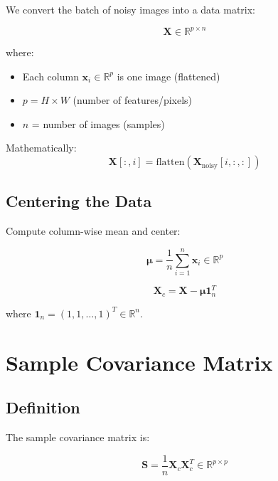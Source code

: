 \documentclass[12pt,a4paper]{article}
\begin{document}
We convert the batch of noisy images into a data matrix:

\begin{equation}
\mathbf{X} \in \mathbb{R}^{p \times n}
\end{equation}

where:
\begin{itemize}
    \item Each column $\mathbf{x}_i \in \mathbb{R}^p$ is one image (flattened)
    \item $p = H \times W$ (number of features/pixels)
    \item $n$ = number of images (samples)
\end{itemize}

Mathematically:
\begin{equation}
\mathbf{X}[:, i] = \text{flatten}(\mathbf{X}_{\text{noisy}}[i, :, :])
\end{equation}

\subsection{Centering the Data}

Compute column-wise mean and center:

\begin{equation}
\boldsymbol{\mu} = \frac{1}{n}\sum_{i=1}^n \mathbf{x}_i \in \mathbb{R}^p
\end{equation}

\begin{equation}
\mathbf{X}_c = \mathbf{X} - \boldsymbol{\mu} \mathbf{1}_n^T
\end{equation}

where $\mathbf{1}_n = (1, 1, \ldots, 1)^T \in \mathbb{R}^n$.

\section{Sample Covariance Matrix}

\subsection{Definition}

The sample covariance matrix is:

\begin{equation}
\mathbf{S} = \frac{1}{n}\mathbf{X}_c \mathbf{X}_c^T \in \mathbb{R}^{p \times p}
\end{equation}
\end{document}
